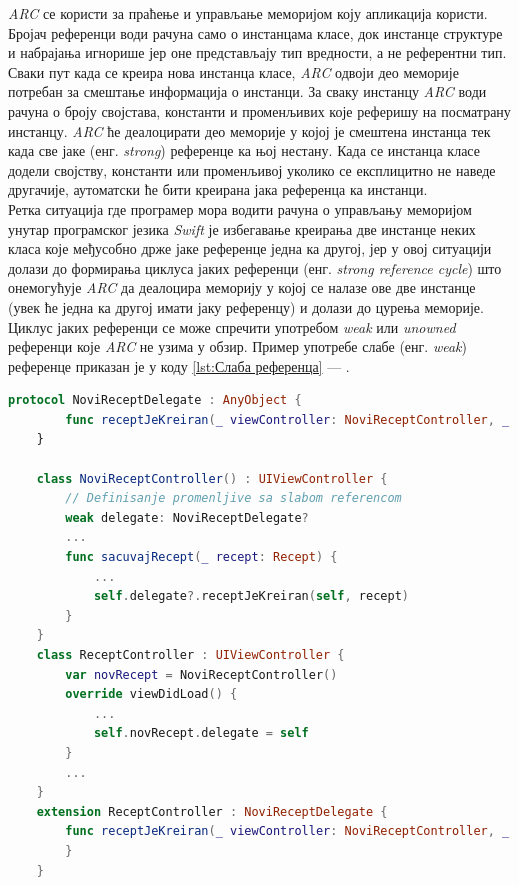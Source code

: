 \documentclass[12pt,oneside]{memoir}
\begin{document}
\indent \textit{ARC} се користи за праћење и управљање меморијом коју апликација користи. Бројач референци води рачуна само о инстанцама класе, док инстанце структуре и набрајања игнорише јер оне представљају тип вредности, а не референтни тип. Сваки пут када се креира нова инстанца класе, \textit{ARC} одвоји део меморије потребан за смештање информација о инстанци. За сваку инстанцу \textit{ARC} води рачуна о броју својстава, константи и променљивих које реферишу на посматрану инстанцу. \textit{ARC} ће деалоцирати део меморије у којој је смештена инстанца тек када све јаке (енг. \textit{strong}) референце ка њој нестану. Када се инстанца класе додели својству, константи или променљивој уколико се експлицитно не наведе другачије, аутоматски ће бити креирана јака референца ка инстанци. \\
\indent Ретка ситуација где програмер мора водити рачуна о управљању меморијом унутар програмског језика \textit{Swift} је избегавање креирања две инстанце неких класа које међусобно држе јаке референце једна ка другој, јер у овој ситуацији долази до формирања циклуса јаких референци (енг. \textit{strong reference cycle}) што онемогућује \textit{ARC} да деалоцира меморију у којој се налазе ове две инстанце (увек ће једна ка другој имати јаку референцу) и долази до цурења меморије. Циклус јаких референци се може спречити употребом \textit{weak} или \textit{unowned} референци које \textit{ARC} не узима у обзир. Пример употребе слабе (енг. \textit{weak}) референце приказан је у коду \ref{lst:Слаба референца} --- .

\begin{lstlisting}[caption=\textit{{Слаба референца}}, label={lst:Слаба референца}, language=Swift, frame=single]
    protocol NoviReceptDelegate : AnyObject {
        func receptJeKreiran(_ viewController: NoviReceptController, _ recept: Recept)
    }
    
    class NoviReceptController() : UIViewController {
        // Definisanje promenljive sa slabom referencom
        weak delegate: NoviReceptDelegate?
        ...
        func sacuvajRecept(_ recept: Recept) {
            ...
            self.delegate?.receptJeKreiran(self, recept)
        }
    }
    class ReceptController : UIViewController {
        var novRecept = NoviReceptController()
        override viewDidLoad() {
            ...
            self.novRecept.delegate = self
        }
        ...
    }
    extension ReceptController : NoviReceptDelegate {
        func receptJeKreiran(_ viewController: NoviReceptController, _ recept: Recept) {
        }
    }
\end{lstlisting}
\end{document}
